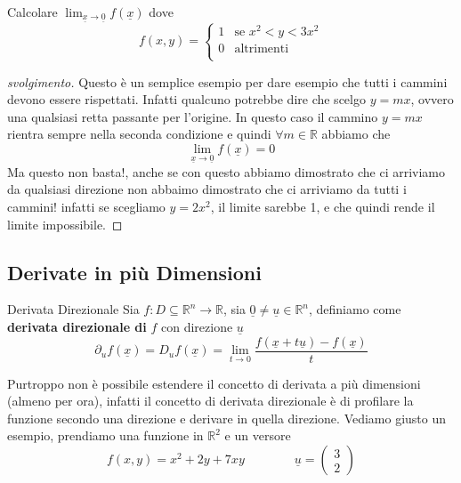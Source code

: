 \documentclass{rapport}
\begin{document}
\begin{esercizio}{}{}
  Calcolare $\displaystyle\lim_{\underline{x} \to \underline{0}} f(\underline{x})$ dove 
\[
f(x,y) = \begin{cases}
  1  &\text{se } x^2 < y < 3x^2 \\
  0  &\text{altrimenti }  \\
\end{cases}
\]
\end{esercizio}

\begin{proof}[svolgimento]
  Questo è un semplice esempio per dare esempio che tutti i cammini devono essere rispettati. Infatti qualcuno potrebbe dire che scelgo $y=mx$, ovvero una qualsiasi retta passante per l'origine. In questo caso il cammino $y=mx$ rientra sempre nella seconda condizione e quindi $\forall m \in \mathbb{R}$ abbiamo che 
  \[
  \lim_{\underline{x} \to \underline{0}}f(\underline{x}) = 0
  \] 
  Ma questo non basta!, anche se con questo abbiamo dimostrato che ci arriviamo da qualsiasi direzione non abbaimo dimostrato che ci arriviamo da tutti i cammini! infatti se scegliamo $y=2x^2$, il limite sarebbe 1, e che quindi rende il limite impossibile.
\end{proof}

\newpage
\subsection{Derivate in più Dimensioni}
\begin{definizione}{Derivata Direzionale}{}
  Sia $f:D \subseteq \mathbb{R}^n \to \mathbb{R}$, sia $\underline{0} \ne \underline{u} \in \mathbb{R}^n$, definiamo come \textbf{derivata direzionale di } $f$ con direzione $\underline{u}$ 
  \[
  \partial_{u}f(\underline{x}) = D_{u} f(\underline{x}) = \lim_{t\to 0} \dfrac{f(\underline{x} + t\underline{u}) - f(\underline{x})}{t}
  \]  
\end{definizione}

Purtroppo non è possibile estendere il concetto di derivata a più dimensioni (almeno per ora), infatti il concetto di derivata direzionale è di profilare la funzione secondo una direzione e derivare in quella direzione. Vediamo giusto un esempio, prendiamo una funzione in $\mathbb{R}^2$ e un versore 
\[
f(x,y) = x^2+2y +7xy \qquad\qquad \underline{u} = \begin{pmatrix}
  3 \\
  2
\end{pmatrix}
\]
\end{document}
